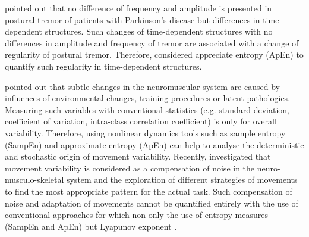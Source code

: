 \cite{vaillancourt2001} pointed out that no difference of frequency and amplitude 
is presented in postural tremor of patients with Parkinson's disease
but differences in time-dependent structures.
Such changes of time-dependent structures with no differences in amplitude and 
frequency of tremor are associated  with a change of regularity of postural tremor.
Therefore, \cite{vaillancourt2001} considered appreciate entropy (ApEn) to quantify
such regularity in time-dependent structures.


\cite{preatoni2010} pointed out that subtle changes in the neuromuscular system are caused 
by influences of environmental changes, training procedures or latent pathologies.
Measuring such variables with conventional statistics (e.g. standard deviation, 
coefficient of variation, intra-class correlation coefficient) is only for overall
variability. Therefore, using nonlinear dynamics tools such as sample entropy (SampEn)
and approximate entropy (ApEn) can help to analyse the deterministic and stochastic
origin of movement variability.
Recently, \cite{preatoni2013} investigated that movement variability is considered
as a compensation of noise in the neuro-musculo-skeletal system 
and the exploration of different strategies of movements to find the most
appropriate pattern for the actual task. 
Such compensation of noise and adaptation of movements cannot be
quantified entirely with the use of conventional approaches for which 
non only the use of entropy measures (SampEn and ApEn) but 
Lyapunov exponent \cite{abarbanel1993, smith2010}.





